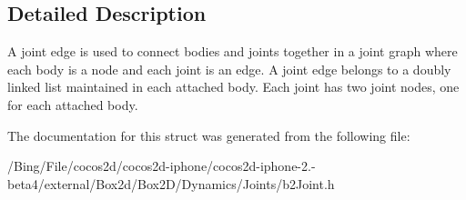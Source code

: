 \subsection{Detailed Description}
A joint edge is used to connect bodies and joints together in a joint graph where each body is a node and each joint is an edge. A joint edge belongs to a doubly linked list maintained in each attached body. Each joint has two joint nodes, one for each attached body. 

The documentation for this struct was generated from the following file\-:\begin{DoxyCompactItemize}
\item 
/\-Bing/\-File/cocos2d/cocos2d-\/iphone/cocos2d-\/iphone-\/2.-\/beta4/external/\-Box2d/\-Box2\-D/\-Dynamics/\-Joints/b2\-Joint.\-h\end{DoxyCompactItemize}
